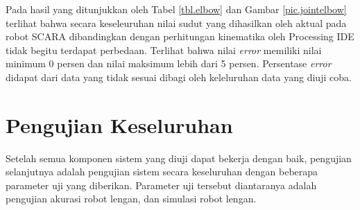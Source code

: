  Pada hasil yang ditunjukkan oleh Tabel \ref{tbl.elbow} dan Gambar \ref{pic.jointelbow} terlihat bahwa secara keseleuruhan nilai sudut yang dihasilkan oleh aktual pada robot SCARA dibandingkan dengan perhitungan kinematika oleh Processing IDE tidak begitu terdapat perbedaan. Terlihat bahwa nilai \textit{error}
 memiliki nilai minimum 0 persen dan nilai maksimum lebih dari 5 persen. Persentase \textit{error} didapat dari data yang tidak sesuai dibagi oleh keleluruhan data yang diuji coba. 

\section{Pengujian Keseluruhan}
Setelah semua komponen sistem yang diuji dapat bekerja dengan baik, pengujian selanjutnya adalah pengujian sistem secara keseluruhan dengan beberapa parameter uji yang diberikan. Parameter uji tersebut diantaranya adalah pengujian akurasi robot lengan, dan simulasi robot lengan. 

